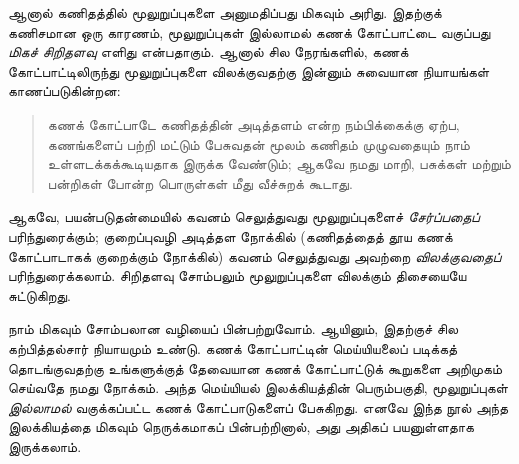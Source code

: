 \documentclass[../../../include/open-logic-section]{subfiles}
\begin{document}
ஆனால் கணிதத்தில் மூலுறுப்புகளை அனுமதிப்பது மிகவும் அரிது. இதற்குக்
கணிசமான ஒரு காரணம், மூலுறுப்புகள் இல்லாமல் கணக் கோட்பாட்டை வகுப்பது
\emph{மிகச் சிறிதளவு} எளிது என்பதாகும். ஆனால் சில நேரங்களில், கணக்
கோட்பாட்டிலிருந்து மூலுறுப்புகளை விலக்குவதற்கு இன்னும் சுவையான
நியாயங்கள் காணப்படுகின்றன:
\begin{quote}
	கணக் கோட்பாடே கணிதத்தின் அடித்தளம் என்ற நம்பிக்கைக்கு ஏற்ப, கணங்களைப்
	பற்றி மட்டும் பேசுவதன் மூலம் கணிதம் முழுவதையும் நாம் உள்ளடக்கக்கூடியதாக
	இருக்க வேண்டும்; ஆகவே நமது மாறி, பசுக்கள் மற்றும் பன்றிகள் போன்ற
	பொருள்கள் மீது வீச்சுறக் கூடாது.
	\citep[p.~8]{Kunen1980}
\end{quote}
ஆகவே, பயன்படுதன்மையில் கவனம் செலுத்துவது மூலுறுப்புகளைச்
\emph{சேர்ப்பதைப்} பரிந்துரைக்கும்; குறைப்புவழி அடித்தள நோக்கில்
(கணிதத்தைத் தூய கணக் கோட்பாடாகக் குறைக்கும் நோக்கில்) கவனம் செலுத்துவது
அவற்றை \emph{விலக்குவதைப்} பரிந்துரைக்கலாம். சிறிதளவு சோம்பலும்
மூலுறுப்புகளை விலக்கும் திசையையே சுட்டுகிறது.

நாம் மிகவும் சோம்பலான வழியைப் பின்பற்றுவோம். ஆயினும், இதற்குச் சில
கற்பித்தல்சார் நியாயமும் உண்டு. கணக் கோட்பாட்டின் மெய்யியலைப் படிக்கத்
தொடங்குவதற்கு உங்களுக்குத் தேவையான கணக் கோட்பாட்டுக் கூறுகளை அறிமுகம்
செய்வதே நமது நோக்கம். அந்த மெய்யியல் இலக்கியத்தின் பெரும்பகுதி,
மூலுறுப்புகள் \emph{இல்லாமல்} வகுக்கப்பட்ட கணக் கோட்பாடுகளைப் பேசுகிறது.
எனவே இந்த நூல் அந்த இலக்கியத்தை மிகவும் நெருக்கமாகப் பின்பற்றினால்,
அது அதிகப் பயனுள்ளதாக இருக்கலாம்.
\end{document}
